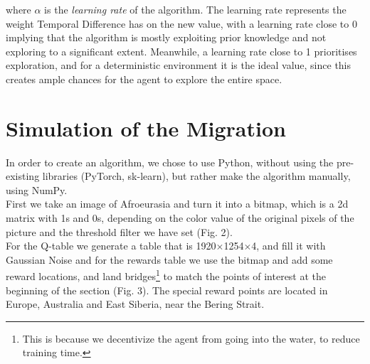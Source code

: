 \documentclass[11pt]{article}
\begin{document}
\begin{multicols}{2}
where $\alpha$ is the \textit{learning rate} of the algorithm. The learning rate represents the weight Temporal Difference has on the new value, with a learning rate close to 0 implying that the algorithm is mostly exploiting prior knowledge and not exploring to a significant extent. Meanwhile, a learning rate close to 1 prioritises exploration, and for a deterministic environment it is the ideal value, since this creates ample chances for the agent to explore the entire space.

\section{Simulation of the Migration}

In order to create an algorithm, we chose to use Python, without using the pre-existing libraries (PyTorch, sk-learn), but rather make the algorithm manually, using NumPy.\\
First we  take an image of Afroeurasia and turn it into a bitmap, which is a 2d matrix with 1s and 0s, depending on the color value of the original pixels of the picture and the threshold filter we have set (Fig. 2).\\
For the Q-table we generate a table that is 1920$\times$1254$\times$4, and fill it with Gaussian Noise and for the rewards table we use the bitmap and add some reward locations, and land bridges\footnote{This is because we decentivize the agent from going into the water, to reduce training time.} to match the points of interest at the beginning of the section (Fig. 3). The special reward points are located in Europe, Australia and East Siberia, near the Bering Strait.


\end{multicols}
\end{document}
